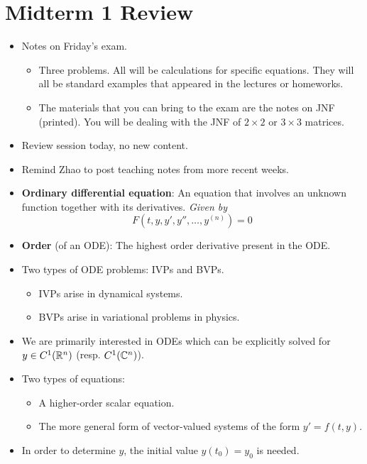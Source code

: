 \documentclass[../notes.tex]{subfiles}
\begin{document}
\section{Midterm 1 Review}
\begin{itemize}
    \item {}Notes on Friday's exam.
    \begin{itemize}
        \item Three problems. All will be calculations for specific equations. They will all be standard examples that appeared in the lectures or homeworks.
        \item The materials that you can bring to the exam are the notes on JNF (printed). You will be dealing with the JNF of $2\times 2$ or $3\times 3$ matrices.
    \end{itemize}
    \item Review session today, no new content.
    \item Remind Zhao to post teaching notes from more recent weeks.
    \item \textbf{Ordinary differential equation}: An equation that involves an unknown function together with its derivatives. \emph{Given by}
    \begin{equation*}
        F(t,y,y',y'',\dots,y^{(n)}) = 0
    \end{equation*}
    \item \textbf{Order} (of an ODE): The highest order derivative present in the ODE.
    \item Two types of ODE problems: IVPs and BVPs.
    \begin{itemize}
        \item IVPs arise in dynamical systems.
        \item BVPs arise in variational problems in physics.
    \end{itemize}
    \item We are primarily interested in ODEs which can be explicitly solved for $y\in C^1(\mathbb{R}^n)$ (resp. $C^1(\mathbb{C}^n)$).
    \item Two types of equations:
    \begin{itemize}
        \item A higher-order scalar equation.
        \item The more general form of vector-valued systems of the form $y'=f(t,y)$.
    \end{itemize}
    \item In order to determine $y$, the initial value $y(t_0)=y_0$ is needed.

\end{itemize}
\end{document}
